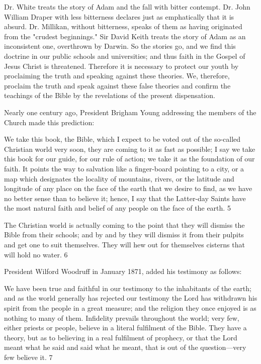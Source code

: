 Dr. White treats the story of Adam and the fall with bitter contempt. Dr. John William
Draper with less bitterness declares just as emphatically that it is absurd. Dr. Millikan,
without bitterness, speaks of them as having originated from the "crudest beginnings." Sir
David Keith treats the story of Adam as an inconsistent one, overthrown by Darwin. So the
stories go, and we find this doctrine in our public schools and universities; and thus faith in
the Gospel of Jesus Christ is threatened. Therefore it is necessary to protect our youth by
proclaiming the truth and speaking against these theories. We, therefore, proclaim the truth
and speak against these false theories and confirm the teachings of the Bible by the
revelations of the present dispensation.

Nearly one century ago, President Brigham Young addressing the members of the Church
made this prediction:

We take this book, the Bible, which I expect to be voted out of the so-called Christian world
very soon, they are coming to it as fast as possible; I say we take this book for our guide, for
our rule of action; we take it as the foundation of our faith. It points the way to salvation like
a finger-board pointing to a city, or a map which designates the locality of mountains, rivers,
or the latitude and longitude of any place on the face of the earth that we desire to find, as we
have no better sense than to believe it; hence, I say that the Latter-day Saints have the most
natural faith and belief of any people on the face of the earth. 5

The Christian world is actually coming to the point that they will dismiss the Bible from their
schools; and by and by they will dismiss it from their pulpits and get one to suit themselves.
They will hew out for themselves cisterns that will hold no water. 6

President Wilford Woodruff in January 1871, added his testimony as follows:

We have been true and faithful in our testimony to the inhabitants of the earth; and as the
world generally has rejected our testimony the Lord has withdrawn his spirit from the people
in a great measure; and the religion they once enjoyed is as nothing to many of them.
Infidelity prevails throughout the world; very few, either priests or people, believe in a literal
fulfilment of the Bible. They have a theory, but as to believing in a real fulfilment of
prophecy, or that the Lord meant what he said and said what he meant, that is out of the
question—very few believe it. 7

